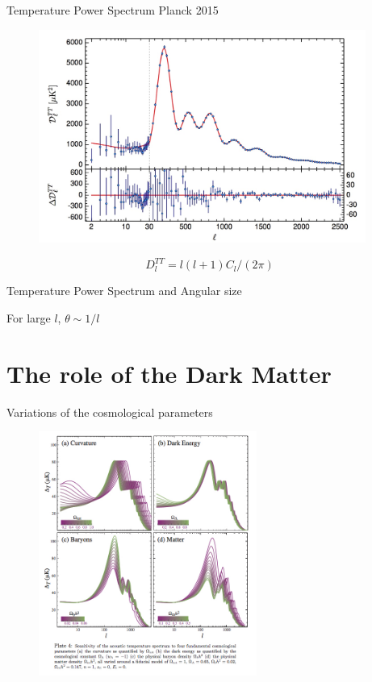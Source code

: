\documentclass{beamer}
\begin{document}
\begin{frame}{Temperature Power Spectrum Planck 2015}
    \begin{figure}
   \includegraphics[height=7cm]{planck2015.jpeg}
\end{figure}
$$D_l ^{TT} = l(l+1)C_l/(2\pi)$$
\end{frame}

\begin{frame}{Temperature Power Spectrum and Angular size}
    \\
    \begin{center}
        For large $l$, $
			\theta \sim 1/l
			$
    \end{center}
    
\end{frame}


\section{The role of the Dark Matter}

\begin{frame}{Variations of the cosmological parameters}
    \begin{figure}
   \includegraphics[height=8cm]{dt_parameter_variation}
\end{figure}

\end{frame}
\end{document}
